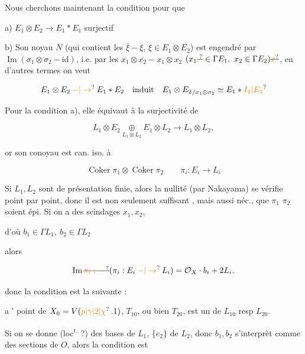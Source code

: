  Nous cherchons maintenant la condition pour que

a) $E_1\otimes E_2\longrightarrow E_1*E_1$ surjectif

b) Son noyau $N$ (qui contient les $\overline{\xi}-\xi$, $\xi\in E_1\otimes\overline{E_2}$) est engendré par  $\operatorname{Im}(\sigma_1\otimes\sigma_2-\mathrm{id})$, i.e. par les $\overline{x_1}\otimes\overline{x_2}-x_1\otimes x_2$ $(x_1\deleted{\unsure{,}}\in\Gamma E_1,\ x_2\in\Gamma E_2)\deleted{\unsure{x}}$,  en d'autres termes on veut

\[ E_1\otimes E_2\mathbin{\unsure{-|\to}}E_1*E_2\quad\text{induit}\quad {E_1\otimes E_2}_{/\sigma_1\otimes\sigma_2}\simeq E_1*\unsure{I_2|E_2} \]

 Pour la condition a), elle équivaut à la surjectivité de

\[ L_1\otimes E_2\underset{L_1\otimes L_2}{\oplus}E_1\otimes L_2\longrightarrow L_1\otimes L_2,\]

or son conoyau est can. iso. à

\[ \operatorname{Coker}\pi_1\otimes\operatorname{Coker}\pi_2\qquad \pi_i:E_i\longrightarrow L_i \]

Si $L_1,L_2$ sont de présentation finie, alors la nullité (par Nakayama) se vérifie point par point, donc il est non seulement suffisant , mais aussi néc., que  $\pi_1$  $\pi_2$ soient épi. Si on a des scindages $x_1,x_2$,

d'où \quad $b_1\in\Gamma L_1,\ b_2\in\Gamma L_2$

alors

\[ \operatorname{Im}\deleted{\unsure{\pi_i:\,-}}(\pi_i:E_i\mathbin{\unsure{-|\to}}L_i)=\mathcal{O}_X\cdot b_i+2L_i. \]

donc la condition est la suivante :


\textcircled{a$'$}   point de $X_0=V(\unsure{p|\gamma|2|\chi}\,.1)$,   $T_{10}$, ou bien $T_{20}$, est un   de $L_{10}$ resp $L_{20}$.


Si on se donne (loc\textsuperscript{t.} ?) des bases   de $L_1$, $\{e_2\}$ de $L_2$, donc $b_1,b_2$ s'interprèt comme des sections de $O$, alors la condition est

